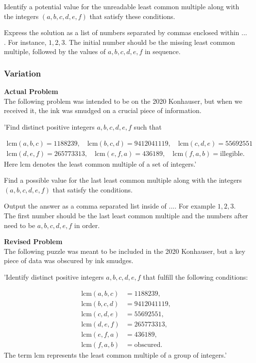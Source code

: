 Identify a potential value for the unreadable least common multiple along with the integers $(a, b, c, d, e, f)$ that satisfy these conditions.

Express the solution as a list of numbers separated by commas enclosed within $\boxed{...}$. For instance, $\boxed{1, 2, 3}$.
The initial number should be the missing least common multiple, followed by the values of $a, b, c, d, e, f$ in sequence.

\subsubsection{Variation}
\textbf{Actual Problem}\\
The following problem was intended to be on the 2020 Konhauser, but when we received it, the ink was smudged on a crucial piece of information.

'Find distinct positive integers $a, b, c, d, e, f$ such that

$$
\begin{aligned}
 \text{lcm}(a, b, c) = 1188239, \quad \text{lcm}(b, c, d) = 9412041119, \quad \text{lcm}(c, d, e) = 55692551 \\
   \text{lcm}(d, e, f) = 265773313, \quad \text{lcm}(e, f, a) = 436189, \quad \text{lcm}(f, a, b) = \text{illegible}.
\end{aligned}
$$
Here lcm denotes the least common multiple of a set of integers.'

Find a possible value for the last least common multiple along with the integers $(a,b,c,d,e,f)$ that satisfy the conditions.

Output the answer as a comma separated list inside of $\boxed{...}$. For example $\boxed{1, 2, 3}$.
The first number should be the last least common multiple and the numbers after need to be $a,b,c,d,e,f$ in order.

\textbf{Revised Problem}\\
The following puzzle was meant to be included in the 2020 Konhauser, but a key piece of data was obscured by ink smudges.

'Identify distinct positive integers $a, b, c, d, e, f$ that fulfill the following conditions:

$$
\begin{aligned}
 \text{lcm}(a, b, c) &= 1188239, \\
 \text{lcm}(b, c, d) &= 9412041119, \\
 \text{lcm}(c, d, e) &= 55692551, \\
 \text{lcm}(d, e, f) &= 265773313, \\
 \text{lcm}(e, f, a) &= 436189, \\
 \text{lcm}(f, a, b) &= \text{obscured}.
\end{aligned}
$$
The term lcm represents the least common multiple of a group of integers.'

